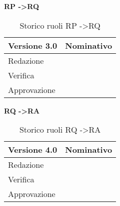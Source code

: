 \textbf{RP -\textgreater RQ}

\begin{table}[h]
\begin{center}

\begin{tabular}{p{} p{}}
\toprule
\textbf{Versione 3.0}	&	\textbf{Nominativo}\\
\midrule
\midrule
Redazione	&	\AB \\
\midrule
Verifica &	\SL	\\
\midrule
Approvazione	&	\VP	\\
\bottomrule
\end{tabular}
\caption{Storico ruoli RP -\textgreater RQ}
\label{tabVers3}
\end{center}
\end{table}

\newpage

\textbf{RQ -\textgreater RA}

\begin{table}[h]
\begin{center}

\begin{tabular}{p{} p{}}
\toprule
\textbf{Versione 4.0}	&	\textbf{Nominativo}\\
\midrule
\midrule
Redazione	&	\FZ \\
\midrule
Verifica &	\EZ	\\
\midrule
Approvazione	&	\AB	\\
\bottomrule
\end{tabular}
\caption{Storico ruoli RQ -\textgreater RA}
\label{tabVers4}
\end{center}
\end{table}